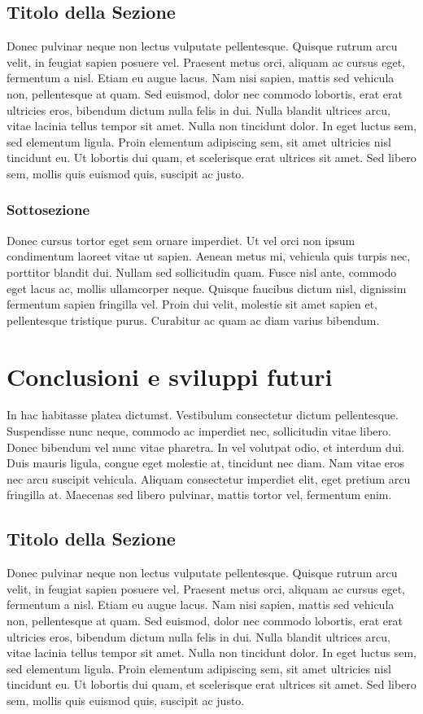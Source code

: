 \documentclass[target=mst,aauheader=,style=]{thud}
\begin{document}
\section{Titolo della Sezione}
Donec pulvinar neque non lectus vulputate pellentesque. Quisque rutrum arcu velit, in feugiat sapien posuere vel. Praesent metus orci, aliquam ac cursus eget, fermentum a nisl. Etiam eu augue lacus. Nam nisi sapien, mattis sed vehicula non, pellentesque at quam. Sed euismod, dolor nec commodo lobortis, erat erat ultricies eros, bibendum dictum nulla felis in dui. Nulla blandit ultrices arcu, vitae lacinia tellus tempor sit amet. Nulla non tincidunt dolor. In eget luctus sem, sed elementum ligula. Proin elementum adipiscing sem, sit amet ultricies nisl tincidunt eu. Ut lobortis dui quam, et scelerisque erat ultrices sit amet. Sed libero sem, mollis quis euismod quis, suscipit ac justo.

\subsection{Sottosezione}
Donec cursus tortor eget sem ornare imperdiet. Ut vel orci non ipsum condimentum laoreet vitae ut sapien. Aenean metus mi, vehicula quis turpis nec, porttitor blandit dui. Nullam sed sollicitudin quam. Fusce nisl ante, commodo eget lacus ac, mollis ullamcorper neque. Quisque faucibus dictum nisl, dignissim fermentum sapien fringilla vel. Proin dui velit, molestie sit amet sapien et, pellentesque tristique purus. Curabitur ac quam ac diam varius bibendum.

\chapter{Conclusioni e sviluppi futuri}
In hac habitasse platea dictumst. Vestibulum consectetur dictum pellentesque. Suspendisse nunc neque, commodo ac imperdiet nec, sollicitudin vitae libero. Donec bibendum vel nunc vitae pharetra. In vel volutpat odio, et interdum dui. Duis mauris ligula, congue eget molestie at, tincidunt nec diam. Nam vitae eros nec arcu suscipit vehicula. Aliquam consectetur imperdiet elit, eget pretium arcu fringilla at. Maecenas sed libero pulvinar, mattis tortor vel, fermentum enim.

\section{Titolo della Sezione}
Donec pulvinar neque non lectus vulputate pellentesque. Quisque rutrum arcu velit, in feugiat sapien posuere vel. Praesent metus orci, aliquam ac cursus eget, fermentum a nisl. Etiam eu augue lacus. Nam nisi sapien, mattis sed vehicula non, pellentesque at quam. Sed euismod, dolor nec commodo lobortis, erat erat ultricies eros, bibendum dictum nulla felis in dui. Nulla blandit ultrices arcu, vitae lacinia tellus tempor sit amet. Nulla non tincidunt dolor. In eget luctus sem, sed elementum ligula. Proin elementum adipiscing sem, sit amet ultricies nisl tincidunt eu. Ut lobortis dui quam, et scelerisque erat ultrices sit amet. Sed libero sem, mollis quis euismod quis, suscipit ac justo.
\end{document}
